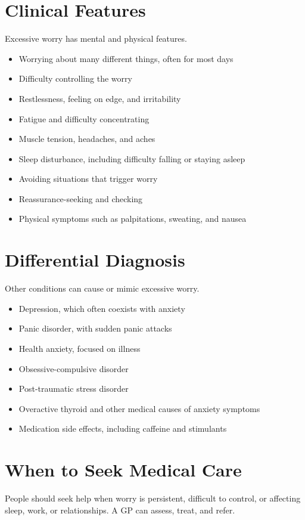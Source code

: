 \section*{Clinical Features}
Excessive worry has mental and physical features.
\begin{itemize}
    \item Worrying about many different things, often for most days
    \item Difficulty controlling the worry
    \item Restlessness, feeling on edge, and irritability
    \item Fatigue and difficulty concentrating
    \item Muscle tension, headaches, and aches
    \item Sleep disturbance, including difficulty falling or staying asleep
    \item Avoiding situations that trigger worry
    \item Reassurance-seeking and checking
    \item Physical symptoms such as palpitations, sweating, and nausea
\end{itemize}

\section*{Differential Diagnosis}
Other conditions can cause or mimic excessive worry.
\begin{itemize}
    \item Depression, which often coexists with anxiety
    \item Panic disorder, with sudden panic attacks
    \item Health anxiety, focused on illness
    \item Obsessive-compulsive disorder
    \item Post-traumatic stress disorder
    \item Overactive thyroid and other medical causes of anxiety symptoms
    \item Medication side effects, including caffeine and stimulants
\end{itemize}

\section*{When to Seek Medical Care}
People should seek help when worry is persistent, difficult to control, or affecting sleep, work, or relationships. A GP can assess, treat, and refer.

